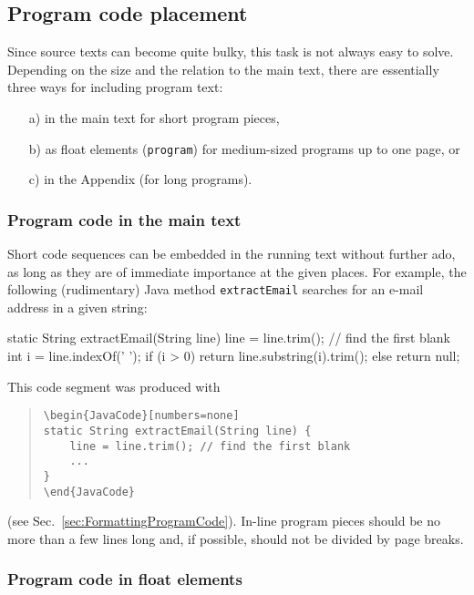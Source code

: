 \subsection{Program code placement}

Since source texts can become quite bulky, this task is not always easy to
solve. Depending on the size and the relation to the main text, there are
essentially three ways for including program text:
%
\begin{itemize}
    \item[a)] in the main text for short program pieces,
    \item[b)] as float elements (\texttt{program}) for medium-sized programs
    up to one page, or
    \item[c)] in the Appendix (for long programs).
\end{itemize}

\subsubsection{Program code in the main text}

Short code sequences can be embedded in the running text without further ado,
as long as they are of immediate importance at the given places.
For example, the following (rudimentary) Java method \texttt{extractEmail}
searches for an e-mail address in a given string:
%
\begin{JavaCode}[numbers=none]
    static String extractEmail(String line) {
        line = line.trim(); // find the first blank
        int i = line.indexOf(' ');
        if (i > 0)
        return line.substring(i).trim();
        else
        return null;
    }
\end{JavaCode}
%
\noindent
This code segment was produced with
%
\begin{quote}
    \begin{verbatim}
\begin{JavaCode}[numbers=none]
static String extractEmail(String line) {
    line = line.trim(); // find the first blank
    ...
}
\end{JavaCode}
    \end{verbatim}
\end{quote}
%
(see Sec.\ \ref{sec:FormattingProgramCode}). In-line program pieces should be
no more than a few lines long and, if possible, should not be divided by page
breaks.

\subsubsection{Program code in float elements}

